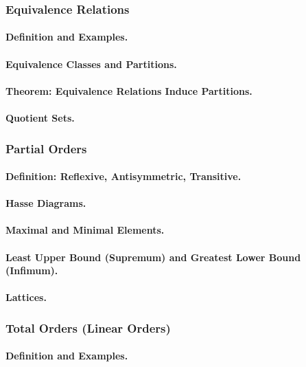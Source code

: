 \subsubsection{Equivalence Relations}
\paragraph{Definition and Examples.}
\paragraph{Equivalence Classes and Partitions.}
\paragraph{Theorem: Equivalence Relations Induce Partitions.}
\paragraph{Quotient Sets.}

\subsubsection{Partial Orders}
\paragraph{Definition: Reflexive, Antisymmetric, Transitive.}
\paragraph{Hasse Diagrams.}
\paragraph{Maximal and Minimal Elements.}
\paragraph{Least Upper Bound (Supremum) and Greatest Lower Bound (Infimum).}
\paragraph{Lattices.}

\subsubsection{Total Orders (Linear Orders)}
\paragraph{Definition and Examples.}
